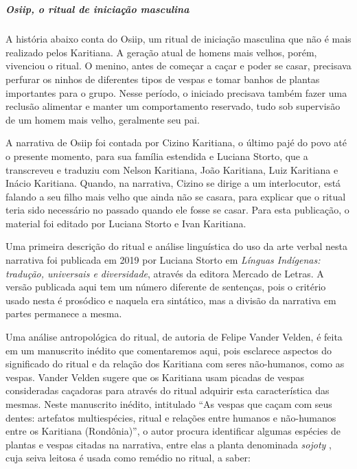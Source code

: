 \chapter*{}
\thispagestyle{empty}

\vspace*{\fill}

\paragraph{Osiip, o ritual de iniciação masculina}
 A história abaixo conta do Osiip, um ritual de iniciação masculina que
 não é mais realizado pelos Karitiana. A geração atual de homens mais
 velhos, porém, vivenciou o ritual. O menino, antes de começar a caçar e
 poder se casar, precisava perfurar os ninhos de diferentes tipos de
 vespas e tomar banhos de plantas importantes para o grupo. Nesse
 período, o iniciado precisava também fazer uma reclusão alimentar e
 manter um comportamento reservado, tudo sob supervisão de um homem mais
 velho, geralmente seu pai.

 A narrativa de Osiip foi contada por Cizino Karitiana, o último pajé do
 povo até o presente momento, para sua família estendida e Luciana
 Storto, que a transcreveu e traduziu com Nelson Karitiana, João
 Karitiana, Luiz Karitiana e Inácio Karitiana. Quando, na narrativa,
 Cizino se dirige a um interlocutor, está falando a seu filho mais velho
 que ainda não se casara, para explicar que o ritual teria sido
 necessário no passado quando ele fosse se casar. Para esta publicação, o
 material foi editado por Luciana Storto e Ivan Karitiana.

 Uma primeira descrição do ritual e análise linguística do uso da arte
 verbal nesta narrativa foi publicada em 2019 por Luciana Storto em
 \textit{Línguas Indígenas: tradução, universais e diversidade}, através da
 editora Mercado de Letras. A versão publicada aqui tem um número
 diferente de sentenças, pois o critério usado nesta é prosódico e
 naquela era sintático, mas a divisão da narrativa em partes permanece a
 mesma.

 Uma análise antropológica do ritual, de autoria de Felipe Vander Velden,
 é feita em um manuscrito inédito que comentaremos aqui, pois esclarece
 aspectos do significado do ritual e da relação dos Karitiana com seres
 não-humanos, como as vespas. Vander Velden sugere que os Karitiana usam
 picadas de vespas consideradas caçadoras para através do ritual adquirir
 esta característica das mesmas. Neste manuscrito inédito, intitulado
 ``As vespas que caçam com seus dentes: artefatos multiespécies, ritual e
 relações entre humanos e não-humanos entre os Karitiana (Rondônia)'', o
 autor procura identificar algumas espécies de plantas e vespas citadas
 na narrativa, entre elas a planta denominada \textit{sojoty} , cuja seiva
 leitosa é usada como remédio no ritual, a saber:

